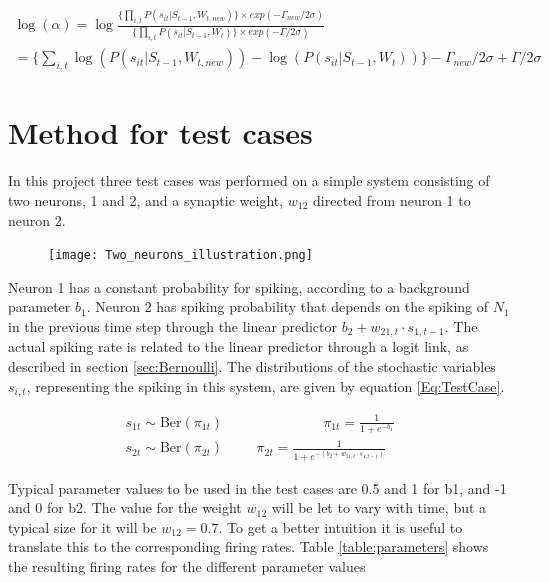 \begin{equation}
\label{eq:ratio}
\begin{split}
    \log (\alpha) = 
    \log \frac{\big \{ \prod_{i,t} P(s_{it}|S_{t-1}, W_{t,new})\big \} \times exp(-\Gamma_{new} /2\sigma)}{\big \{ \prod_{i,t}  P(s_{it}|S_{t-1}, W_t) \big \} \times exp(-\Gamma /2\sigma)} \\
    = \Big \{ \sum_{i,t} \log( P(s_{it}|S_{t-1}, W_{t,new})) - \log( P(s_{it}|S_{t-1}, W_t)) \Big \} -\Gamma_{new} /2\sigma +  \Gamma /2\sigma
\end{split}
\end{equation}


\section{Method for test cases}
\label{Method}

In this project three test cases was performed on a simple system consisting of two neurons, 1 and 2, and a synaptic weight, $w_{12}$ directed from neuron 1 to neuron 2.

\begin{figure}[h]
    \centering
    \texttt{[image: Two\_neurons\_illustration.png]}
\end{figure}

Neuron 1 has a constant probability for spiking, according to a background parameter $b_1$. Neuron 2 has spiking probability that depends on the spiking of $N_1$ in the previous time step through the linear predictor $b_2 + w_{21,t} \cdot s_{1,t-1}$. The actual spiking rate is related to the linear predictor through a logit link, as described in section \ref{sec:Bernoulli}. The distributions of the stochastic variables $s_{i,t}$, representing the spiking in this system, are given by equation \ref{Eq:TestCase}.

\begin{equation}
\begin{split}
\label{Eq:TestCase}
    s_{1t} \sim \text{Ber}(\pi_{1t}) \hspace{3cm} \pi_{1t}= \frac{1}{1+e^{-b_1}} \\
    s_{2t} \sim \text{Ber}(\pi_{2t}) \hspace{1cm} \pi_{2t}= \frac{1}{1+e^{-(b_2 + w_{21,t} \cdot s_{1,t-1})}}
\end{split}
\end{equation}

Typical parameter values to be used in the test cases are 0.5 and 1 for b1, and -1 and 0 for b2. The value for the weight $w_{12}$ will be let to vary with time, but a typical size for it will be $w_{12}=0.7$. To get a better intuition it is useful to translate this to the corresponding firing rates. Table \ref{table:parameters} shows the resulting firing rates for the different parameter values


